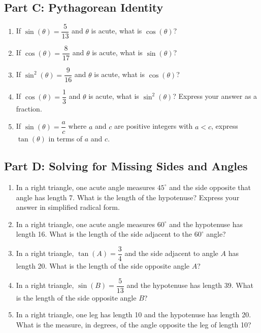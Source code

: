 \documentclass[14pt]{extarticle}
\begin{document}
\subsection*{Part C: Pythagorean Identity}
\begin{enumerate}
  \item If \(\sin(\theta) = \dfrac{5}{13}\) and \(\theta\) is acute, what is \(\cos(\theta)\)?
  \item If \(\cos(\theta) = \dfrac{8}{17}\) and \(\theta\) is acute, what is \(\sin(\theta)\)?
  \item If \(\sin^2(\theta) = \dfrac{9}{16}\) and \(\theta\) is acute, what is \(\cos(\theta)\)?
  \item If \(\cos(\theta) = \dfrac{1}{3}\) and \(\theta\) is acute, what is \(\sin^2(\theta)\)? Express your answer as a fraction.
  \item If \(\sin(\theta) = \dfrac{a}{c}\) where \(a\) and \(c\) are positive integers with \(a < c\), express \(\tan(\theta)\) in terms of \(a\) and \(c\).
\end{enumerate}

\subsection*{Part D: Solving for Missing Sides and Angles}
\begin{enumerate}
  \item In a right triangle, one acute angle measures \(45^\circ\) and the side opposite that angle has length 7. What is the length of the hypotenuse? Express your answer in simplified radical form.
  \item In a right triangle, one acute angle measures \(60^\circ\) and the hypotenuse has length 16. What is the length of the side adjacent to the \(60^\circ\) angle?
  \item In a right triangle, \(\tan(A) = \dfrac{3}{4}\) and the side adjacent to angle \(A\) has length 20. What is the length of the side opposite angle \(A\)?
  \item In a right triangle, \(\sin(B) = \dfrac{5}{13}\) and the hypotenuse has length 39. What is the length of the side opposite angle \(B\)?
  \item In a right triangle, one leg has length 10 and the hypotenuse has length 20. What is the measure, in degrees, of the angle opposite the leg of length 10?
\end{enumerate}
\end{document}
